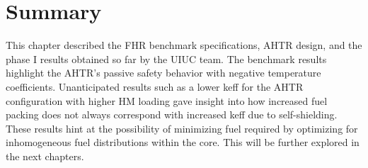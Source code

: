 \section{Summary}

This chapter described the \gls{FHR} benchmark specifications, \gls{AHTR} design,
and the phase I results obtained so far by the UIUC team. 
The benchmark results highlight the \gls{AHTR}'s passive safety behavior with 
negative temperature coefficients. 
Unanticipated results such as a lower keff for the \gls{AHTR} configuration with 
higher \gls{HM} loading gave insight into how increased fuel packing does not always 
correspond with increased keff due to self-shielding.
These results hint at the possibility of minimizing fuel required by optimizing 
for inhomogeneous fuel distributions within the core. 
This will be further explored in the next chapters. 

